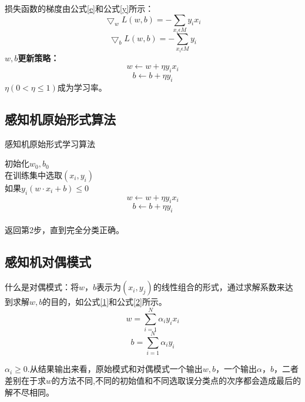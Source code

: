 \documentclass[twocolumn]{article}
\begin{document}
	损失函数的梯度由公式\ref{e}和公式\ref{y}所示：
	\begin{equation}
	\bigtriangledown _{w}L(w,b)= -\sum_{x_{i}\epsilon M}y_{i}x_{i}
	\label{e}
	\end{equation}
	\begin{equation}
	\bigtriangledown _{b}L(w,b)= -\sum_{x_{i}\epsilon M}y_{i}
	\label{y}
	\end{equation}
	\textbf{$w,b$更新策略：}
	$$w\leftarrow w+\eta y_{i}x_{i}$$
	$$b\leftarrow b+\eta y_{i}$$
	$\eta \left ( 0< \eta \leq 1 \right )$成为学习率。
	
	\subsection{感知机原始形式算法}
	\begin{algorithm}
		\caption{感知机原始形式学习算法}
		\LinesNumbered
		
		初始化$w_{0},b_{0}$ \\
		在训练集中选取$(x_{i},y_{i})$\\
		如果$y_{i}(w \cdot x_{i}+b)\leq 0$ 
		$$w\leftarrow w+\eta y_{i}x_{i}$$
		$$b\leftarrow b+\eta y_{i}$$\\
		返回第2步，直到完全分类正确。
	\end{algorithm}

	\subsection{感知机对偶模式}
	什么是对偶模式：将$w，b$表示为$(x_{i},y_{j})$的线性组合的形式，通过求解系数来达到求解$w,b$的目的，如公式\ref{1}和公式\ref{2}所示。
	\begin{equation}
		w=\sum_{i=1}^{N}\alpha _{i}y_{i}x_{i}
		\label{1}
	\end{equation}
	\begin{equation}
	b=\sum_{i=1}^{N}\alpha _{i}y_{i}
	\label{2}
	\end{equation}
	
	$\alpha _{i} \geq 0$.从结果输出来看，原始模式和对偶模式一个输出$w,b$，一个输出$\alpha，b$，二者差别在于求$w$的方法不同,不同的初始值和不同选取误分类点的次序都会造成最后的解不尽相同。
	\\
	\\
	\\
	\\
	
\end{document}
